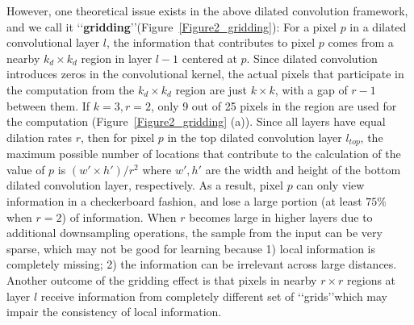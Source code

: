 \documentclass[10pt,twocolumn,letterpaper]{article}
\begin{document}
However, one theoretical issue exists in the above dilated convolution framework, and we call it \lq\lq \textbf{gridding}\rq\rq (Figure~\ref{Figure2_gridding}):  For a pixel $p$ in a dilated convolutional layer $l$, the information that contributes to pixel $p$ comes from a nearby $k_d\times k_d$ region in layer $l-1$ centered at $p$. Since dilated convolution introduces zeros in the convolutional kernel, the actual pixels that participate in the computation from the $k_d\times k_d$ region are just $k\times k$, with a gap of $r-1$ between them. If $k=3, r=2$, only 9 out of 25 pixels in the region are used for the computation (Figure~\ref{Figure2_gridding} (a)). Since all layers have equal dilation rates $r$, then for pixel $p$ in the top dilated convolution layer $l_{top}$, the maximum possible number of locations that contribute to the calculation of the value of $p$ is $(w'\times h')/r^2$ where $w', h'$ are the width and height of the bottom dilated convolution layer, respectively. As a result, pixel $p$ can only view information in a checkerboard fashion, and lose a large portion (at least $75\%$ when $r=2$) of information. When $r$ becomes large in higher layers due to additional downsampling operations, the sample from the input can be very sparse, which may not be good for learning because 1) local information is completely missing; 2) the information can be irrelevant across large distances. Another outcome of the gridding effect is that pixels in nearby $r\times r$ regions at layer $l$ receive information from completely different set of \lq\lq grids\rq\rq which may impair the consistency of local information.
\end{document}
